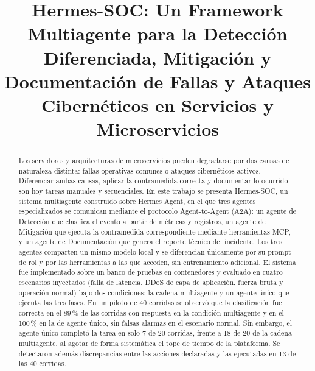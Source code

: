 \documentclass[conference]{IEEEtran}
\begin{document}
\title{Hermes-SOC: Un Framework Multiagente para la Detección Diferenciada,
Mitigación y Documentación de Fallas y Ataques Cibernéticos en Servicios y
Microservicios}

\author{
}

\maketitle

\begin{abstract}
Los servidores y arquitecturas de microservicios pueden degradarse por dos causas
de naturaleza distinta: fallas operativas comunes o ataques cibernéticos activos.
Diferenciar ambas causas, aplicar la contramedida correcta y documentar lo ocurrido
son hoy tareas manuales y secuenciales. En este trabajo se presenta Hermes-SOC, un
sistema multiagente construido sobre Hermes Agent, en el que tres agentes
especializados se comunican mediante el protocolo Agent-to-Agent (A2A): un agente de
Detección que clasifica el evento a partir de métricas y registros, un agente de
Mitigación que ejecuta la contramedida correspondiente mediante herramientas MCP, y
un agente de Documentación que genera el reporte técnico del incidente. Los tres
agentes comparten un mismo modelo local y se diferencian únicamente por su prompt de
rol y por las herramientas a las que acceden, sin entrenamiento adicional. El sistema
fue implementado sobre un banco de pruebas en contenedores y evaluado en cuatro
escenarios inyectados (falla de latencia, DDoS de capa de aplicación, fuerza bruta y
operación normal) bajo dos condiciones: la cadena multiagente y un agente único que
ejecuta las tres fases. En un piloto de 40 corridas se observó que la clasificación fue correcta en el
89\,\% de las corridas con respuesta en la condición multiagente y en el 100\,\% en la
de agente único, sin falsas alarmas en el escenario normal. Sin embargo, el agente
único completó la tarea en solo 7 de 20 corridas, frente a 18 de 20 de la cadena
multiagente, al agotar de forma sistemática el tope de tiempo de la plataforma. Se
detectaron además discrepancias entre las acciones declaradas y las ejecutadas en 13
de las 40 corridas.
\end{abstract}
\end{document}
